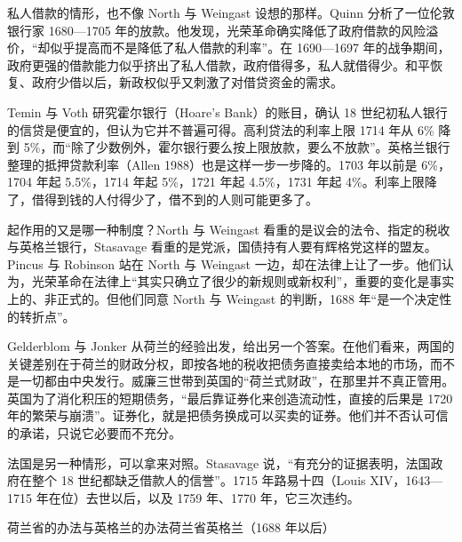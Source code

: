 私人借款的情形，也不像 North 与 Weingast 设想的那样。Quinn 分析了一位伦敦银行家 1680—1705 年的放款。他发现，光荣革命确实降低了政府借款的风险溢价，“却似乎提高而不是降低了私人借款的利率”。在 1690—1697 年的战争期间，政府更强的借款能力似乎挤出了私人借款，政府借得多，私人就借得少。和平恢复、政府少借以后，新政权似乎又刺激了对借贷资金的需求\cite{quinn2001}。

Temin 与 Voth 研究霍尔银行（Hoare's Bank）的账目，确认 18 世纪初私人银行的信贷是便宜的，但认为它并不普遍可得。高利贷法的利率上限 1714 年从 6\% 降到 5\%，而“除了少数例外，霍尔银行要么按上限放款，要么不放款”\cite{tv2008}。英格兰银行整理的抵押贷款利率（Allen 1988）也是这样一步一步降的。1703 年以前是 6\%，1704 年起 5.5\%，1714 年起 5\%，1721 年起 4.5\%，1731 年起 4\%\cite{allen1988}。利率上限降了，借得到钱的人付得少了，借不到的人则可能更多了。

起作用的又是哪一种制度？North 与 Weingast 看重的是议会的法令、指定的税收与英格兰银行，Stasavage 看重的是党派，国债持有人要有辉格党这样的盟友。Pincus 与 Robinson 站在 North 与 Weingast 一边，却在法律上让了一步。他们认为，光荣革命在法律上“其实只确立了很少的新规则或新权利”，重要的变化是事实上的、非正式的。但他们同意 North 与 Weingast 的判断，1688 年“是一个决定性的转折点”\cite{pincus2014}。

Gelderblom 与 Jonker 从荷兰的经验出发，给出另一个答案。在他们看来，两国的关键差别在于荷兰的财政分权，即按各地的税收把债务直接卖给本地的市场，而不是一切都由中央发行。威廉三世带到英国的“荷兰式财政”，在那里并不真正管用。英国为了消化积压的短期债务，“最后靠证券化来创造流动性，直接的后果是 1720 年的繁荣与崩溃”\cite{gj2011}。证券化，就是把债务换成可以买卖的证券。他们并不否认可信的承诺，只说它必要而不充分。

法国是另一种情形，可以拿来对照。Stasavage 说，“有充分的证据表明，法国政府在整个 18 世纪都缺乏借款人的信誉”。1715 年路易十四（Louis XIV，1643—1715 年在位）去世以后，以及 1759 年、1770 年，它三次违约\cite{stasavage2002}。

\begin{compare}{荷兰省的办法与英格兰的办法}{荷兰省}{英格兰（1688 年以后）}
\end{compare}


